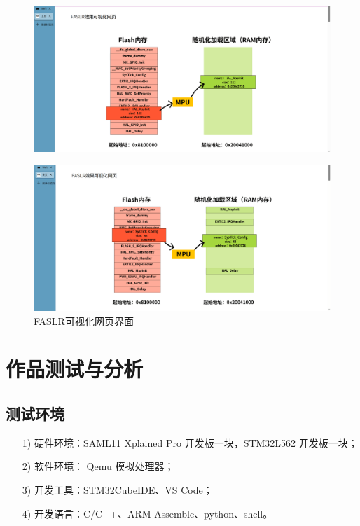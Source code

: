 \documentclass[UTF8,12pt,a4paper]{ctexart}
\numberwithin{figure}{section}
\begin{document}
\begin{figure}[H]
    \centering
    \includegraphics[scale=0.15]{graph/web1.png}
\end{figure}
\begin{figure}[H]
    \centering
    \includegraphics[scale=0.15]{graph/web2.png}
    \caption{FASLR可视化网页界面}
    \label{web}
\end{figure}


\section{作品测试与分析}
\subsection{测试环境}
\begin{itemize}
    \item[1)] 硬件环境：SAML11 Xplained Pro 开发板一块，STM32L562 开发板一块；
    \item[2)] 软件环境： Qemu 模拟处理器；
    \item[3)] 开发工具：STM32CubeIDE、VS Code；
    \item[4)] 开发语言：C/C++、ARM Assemble、python、shell。
\end{itemize}
\end{document}
